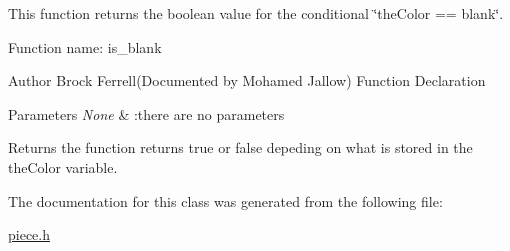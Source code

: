 This function returns the boolean value for the conditional \char`\"{}the\+Color == blank\char`\"{}. 

Function name\+: is\+\_\+blank \begin{DoxyAuthor}{Author}
Brock Ferrell(\+Documented by Mohamed Jallow) Function Declaration 
\end{DoxyAuthor}

\begin{DoxyParams}{Parameters}
{\em None} & \+:there are no parameters \\
\hline
\end{DoxyParams}
\begin{DoxyReturn}{Returns}
the function returns true or false depeding on what is stored in the the\+Color variable. 
\end{DoxyReturn}


The documentation for this class was generated from the following file\+:\begin{DoxyCompactItemize}
\item 
\mbox{\hyperlink{piece_8h}{piece.\+h}}\end{DoxyCompactItemize}
